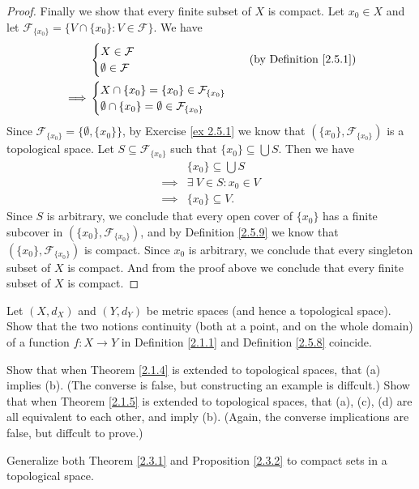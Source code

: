\begin{proof}
    Finally we show that every finite subset of \(X\) is compact.
    Let \(x_0 \in X\) and let \(\mathcal{F}_{\{x_0\}} = \big\{V \cap \{x_0\} : V \in \mathcal{F}\big\}\).
    We have
    \begin{align*}
                 & \begin{cases}
            X \in \mathcal{F} \\
            \emptyset \in \mathcal{F}
        \end{cases} & \text{(by Definition \ref{2.5.1})} \\
        \implies & \begin{cases}
            X \cap \{x_0\} = \{x_0\} \in \mathcal{F}_{\{x_0\}} \\
            \emptyset \cap \{x_0\} = \emptyset \in \mathcal{F}_{\{x_0\}}
        \end{cases}
    \end{align*}
    Since \(\mathcal{F}_{\{x_0\}} = \big\{\emptyset, \{x_0\}\big\}\), by Exercise \ref{ex 2.5.1} we know that \((\{x_0\}, \mathcal{F}_{\{x_0\}})\) is a topological space.
    Let \(S \subseteq \mathcal{F}_{\{x_0\}}\) such that \(\{x_0\} \subseteq \bigcup S\).
    Then we have
    \begin{align*}
                 & \{x_0\} \subseteq \bigcup S  \\
        \implies & \exists\ V \in S : x_0 \in V \\
        \implies & \{x_0\} \subseteq V.
    \end{align*}
    Since \(S\) is arbitrary, we conclude that every open cover of \(\{x_0\}\) has a finite subcover in \((\{x_0\}, \mathcal{F}_{\{x_0\}})\), and by Definition \ref{2.5.9} we know that \((\{x_0\}, \mathcal{F}_{\{x_0\}})\) is compact.
    Since \(x_0\) is arbitrary, we conclude that every singleton subset of \(X\) is compact.
    And from the proof above we conclude that every finite subset of \(X\) is compact.
\end{proof}

\begin{exercise}\label{ex 2.5.15}
    Let \((X, d_X)\) and \((Y, d_Y)\) be metric spaces (and hence a topological space).
    Show that the two notions continuity (both at a point, and on the whole domain) of a function \(f : X \to Y\) in Definition \ref{2.1.1} and Definition \ref{2.5.8} coincide.
\end{exercise}

\begin{exercise}\label{ex 2.5.16}
    Show that when Theorem \ref{2.1.4} is extended to topological spaces, that (a) implies (b).
    (The converse is false, but constructing an example is diffcult.)
    Show that when Theorem \ref{2.1.5} is extended to topological spaces, that (a), (c), (d) are all equivalent to each other, and imply (b).
    (Again, the converse implications are false, but diffcult to prove.)
\end{exercise}

\begin{exercise}\label{ex 2.5.17}
    Generalize both Theorem \ref{2.3.1} and Proposition \ref{2.3.2} to compact sets in a topological space.
\end{exercise}